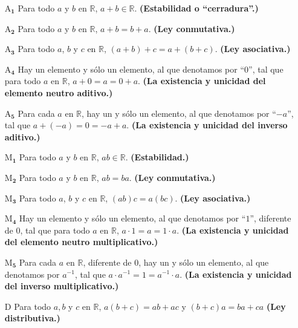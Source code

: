 \begin{itemize}
	\item[$\bm{\mathrm{A}_{1}}$] Para todo $a$ y $b$ en $\mathbb{R}$, $a+b \in \mathbb{R}$.  \textbf{(Estabilidad o “cerradura”.)}
	\item[$\bm{\mathrm{A}_{2}}$] Para todo $a$ y $b$ en $\mathbb{R}$, $a+b = b+a$. \textbf{(Ley conmutativa.)}
	\item[$\bm{\mathrm{A}_{3}}$] Para todo $a$, $b$ y $c$ en $\mathbb{R}$, $(a+b)+c = a +(b+c)$. \textbf{(Ley asociativa.)}
	\item[$\bm{\mathrm{A}_{4}}$] Hay un elemento y sólo un elemento, al que denotamos por “$0$”, tal que para todo $a$ en $\mathbb{R}$, $a+0 = a = 0+a$. \textbf{(La existencia y unicidad del elemento neutro aditivo.)}
	\item[$\bm{\mathrm{A}_{5}}$] Para cada  $a$ en $\mathbb{R}$, hay un y sólo un elemento, al que denotamos por “$-a$”, tal que $a+(-a) = 0 = -a + a$. \textbf{(La existencia y unicidad del inverso aditivo.)}
	
	\item[$\bm{\mathrm{M}_{1}}$] Para todo $a$ y $b$ en $\mathbb{R}$, $ab \in \mathbb{R}$.  \textbf{(Estabilidad.)}
	\item[$\bm{\mathrm{M}_{2}}$] Para todo $a$ y $b$ en $\mathbb{R}$, $ab = ba$. \textbf{(Ley conmutativa.)}
	\item[$\bm{\mathrm{M}_{3}}$] Para todo $a$, $b$ y $c$ en $\mathbb{R}$, $(ab)c = a(bc)$. \textbf{(Ley asociativa.)}
	\item[$\bm{\mathrm{M}_{4}}$] Hay un elemento y sólo un elemento, al que denotamos por “$1$”, diferente de 0, tal que para todo $a$ en $\mathbb{R}$, $a\cdot 1 = a = 1\cdot a$. \textbf{(La existencia y unicidad del elemento neutro multiplicativo.)}
	\item[$\bm{\mathrm{M}_{5}}$] Para cada  $a$ en $\mathbb{R}$, diferente de $0$, hay un y sólo un elemento, al que denotamos por $a^{-1}$, tal que $a\cdot a^{-1} = 1 = a^{-1} \cdot a$. \textbf{(La existencia y unicidad del inverso multiplicativo.)}
	
	\item[$\bm{\mathrm{D}}$] Para todo $a, b$ y $c$ en $\mathbb{R}$, $a(b+c) = ab + ac$ y  $(b+c)a = ba + ca$ \textbf{(Ley distributiva.)}
	

\end{itemize}
